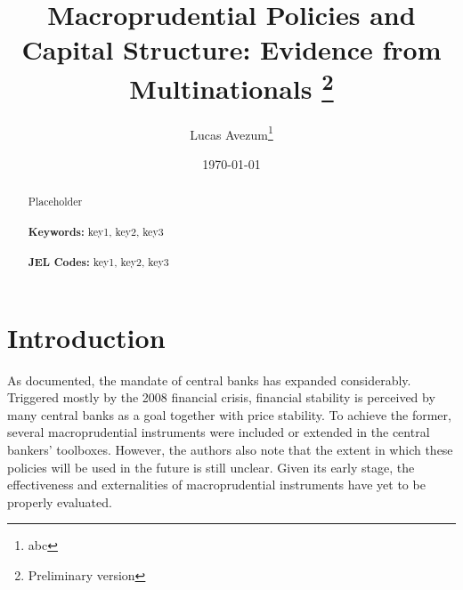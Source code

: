 \documentclass[12pt]{article}
\begin{document}
	
	\begin{titlepage}
		\title{Macroprudential Policies and Capital Structure: Evidence from Multinationals \thanks{Preliminary version}}
		\author{Lucas Avezum\thanks{abc}}
		\date{\today}
		\maketitle
		\begin{abstract}
			\noindent Placeholder\\
			\vspace{0in}\\
			\noindent\textbf{Keywords:} key1, key2, key3\\
			\vspace{0in}\\
			\noindent\textbf{JEL Codes:} key1, key2, key3\\
			
			\bigskip
		\end{abstract}
		\setcounter{page}{0}
		\thispagestyle{empty}
	\end{titlepage}
	\pagebreak \newpage
	
	
	
	
	\doublespacing
	
	
	\section{Introduction} \label{sec:introduction}
	As \cite*{NBERw22735} documented, the mandate of central banks has expanded considerably. Triggered mostly by the 2008 financial crisis, financial stability is perceived by many central banks as a goal together with price stability. To achieve the former, several macroprudential instruments were included or extended in the central bankers' toolboxes. However, the authors also note that the extent in which these policies will be used in the future is still unclear. Given its early stage, the effectiveness and externalities of macroprudential instruments have yet to be properly evaluated. 
	
\end{document}
